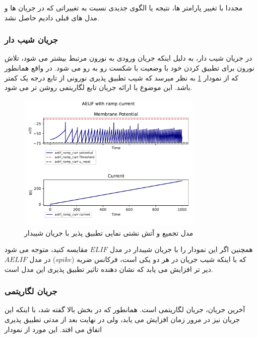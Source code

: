 \documentclass{article}
\begin{document}
                مجددا با تغییر پارامتر ها، نتیجه یا الگوی جدیدی نسبت به تغییراتی که در جریان ها و مدل های قبلی دادیم حاصل نشد.
            \subsubsection{جریان شیب دار}
                در جریان شیب دار، به دلیل اینکه جریان ورودی به نورون مرتبط بیشتر می شود، تلاش نورون برای تطبیق کردن خود با وضعیت با شکست رو به رو می شود. در واقع همانطور که از نمودار 
                \ref{fig:aelif-ramp-curr}
                به نظر میرسد که شیب تطبیق پذیری نورونی از تابع درجه یک کمتر باشد. این موضوع با ارائه جریان تابع لگاریتمی روشن تر می شود.
                \begin{figure}[H]
                    \centering
                    \includegraphics[width=0.8\textwidth]{plots/AELIF with ramp current.pdf} 
                    \caption{مدل تجمیع و آتش نشتی نمایی تطبیق پذیر با جریان شیبدار}
                    \label{fig:aelif-ramp-curr}
                \end{figure}
                همچنین اگر این نمودار را با جریان شیبدار در مدل 
                $ELIF$ 
                مقایسه کنید، متوجه می شود که با اینکه شیب جریان در هر دو یکی است، فرکانس ضربه
                ($spike$) 
                در مدل 
                $AELIF$ 
                دیر تر افزایش می یابد که نشان دهنده تاثیر تطبیق پذیری این مدل است.

            \subsubsection{جریان لگاریتمی}
                آخرین جریان، جریان لگاریتمی است. همانطور که در بخش بالا گفته شد، با اینکه این جریان نیز در مرور زمان افزایش می یابد، ولی در نهایت بعد از مدتی تطبیق پذیری اتفاق می افتد. این مورد از نمودار
\end{document}
